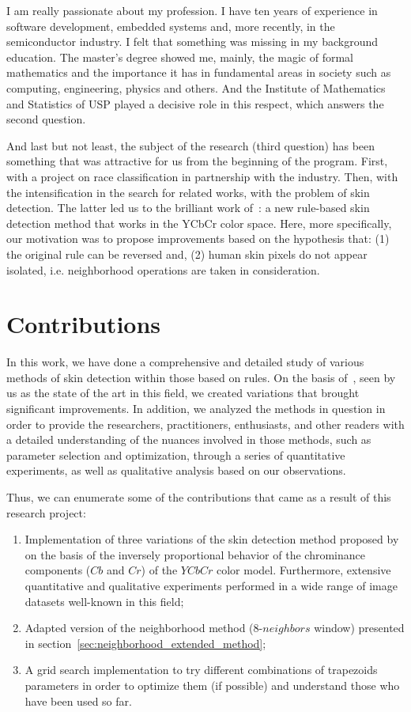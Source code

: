 I am really passionate about my profession. I have ten years of experience in software development, embedded systems and, more recently, in the semiconductor industry. I felt that something was missing in my background education. The master's degree showed me, mainly, the magic of formal mathematics and the importance it has in fundamental areas in society such as computing, engineering, physics and others. And the Institute of Mathematics and Statistics of USP played a decisive role in this respect, which answers the second question.

And last but not least, the subject of the research (third question) has been something that was attractive for us from the beginning of the program. First, with a project on race classification in partnership with the industry. Then, with the intensification in the search for related works, with the problem of skin detection. The latter led us to the brilliant work of~\citet{brancati:17}: a new rule-based skin detection method that works in the YCbCr color space. Here, more specifically, our motivation was to propose improvements based on the hypothesis that: (1) the original rule can be reversed and, (2) human skin pixels do not appear isolated, i.e. neighborhood operations are taken in consideration.


\section{Contributions}
\label{sec:contributions}

In this work, we have done a comprehensive and detailed study of various methods of skin detection within those based on rules. On the basis of~\citet{brancati:17}, seen by us as the state of the art in this field, we created variations that brought significant improvements. In addition, we analyzed the methods in question in order to provide the researchers, practitioners, enthusiasts, and other readers with a detailed understanding of the nuances involved in those methods, such as parameter selection and optimization, through a series of quantitative experiments, as well as qualitative analysis based on our observations.

Thus, we can enumerate some of the contributions that came as a result of this research project:
\begin{enumerate}
    \item Implementation of three variations of the skin detection method proposed by~\citet{brancati:17} on the basis of the inversely proportional behavior of the chrominance components ($Cb$ and $Cr$) of the $YCbCr$ color model. Furthermore, extensive quantitative and qualitative experiments performed in a wide range of image datasets well-known in this field;
    \item Adapted version of the neighborhood method (8-$neighbors$ window) presented in section~\ref{sec:neighborhood_extended_method};
    \item A grid search implementation to try different combinations of trapezoids parameters in order to optimize them (if possible) and understand those who have been used so far.
\end{enumerate}

